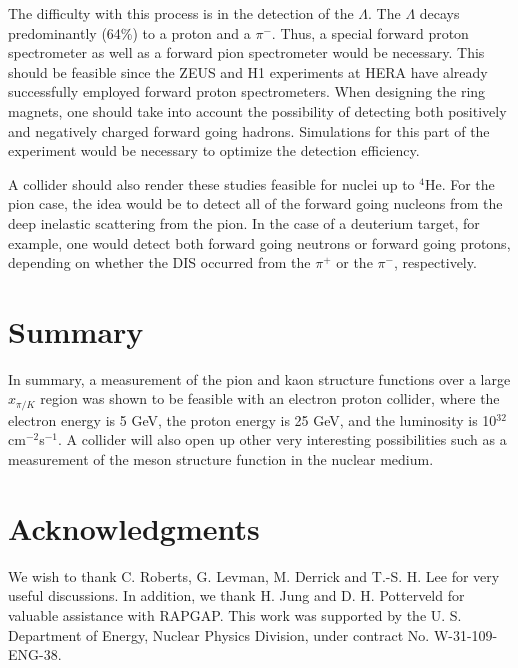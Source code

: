 The difficulty with this process is in the detection of the $\Lambda$.
The $\Lambda$ decays predominantly (64\%) to a proton and a $\pi^-$.
Thus, a special forward proton spectrometer as well as a forward pion
spectrometer would be necessary.  This should be feasible since the
ZEUS and H1 experiments at HERA have already successfully employed
forward proton spectrometers.  When designing the ring magnets, one
should take into account the possibility of detecting both positively
and negatively charged forward going hadrons.  Simulations for this
part of the experiment would be necessary to optimize the detection
efficiency.

A collider should also render these studies feasible for nuclei up to
$^4$He.  For the pion case, the idea would be to detect all of the
forward going nucleons from the deep inelastic scattering from the
pion.  In the case of a deuterium target, for example, one would
detect both forward going neutrons or forward going protons, depending
on whether the DIS occurred from the $\pi^+$ or the $\pi^-$,
respectively.

\section*{Summary}

In summary, a measurement of the pion and kaon structure functions
over a large $x_{\pi/K}$ region was shown to be feasible with an
electron proton collider, where the electron energy is 5 GeV, the
proton energy is 25 GeV, and the luminosity is 10$^{32}$
cm$^{-2}$s$^{-1}$.  A collider will also open up other very
interesting possibilities such as a measurement of the meson structure
function in the nuclear medium.

\section*{Acknowledgments}

We wish to thank C. Roberts, G. Levman, M. Derrick and T.-S. H. Lee
for very useful discussions.  In addition, we thank H. Jung and
D. H. Potterveld for valuable assistance with RAPGAP.  This work was
supported by the U. S. Department of Energy, Nuclear Physics Division,
under contract No. W-31-109-ENG-38.

